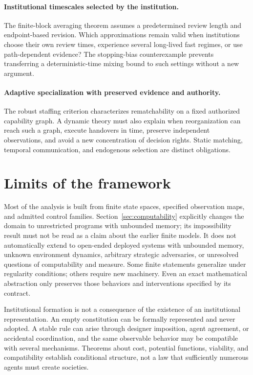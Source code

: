 \documentclass[11pt,letterpaper]{article}
\theoremstyle{plain}
\theoremstyle{definition}
\theoremstyle{remark}
\begin{document}
\paragraph{Institutional timescales selected by the institution.}
The finite-block averaging theorem assumes a predetermined review length and endpoint-based revision. Which approximations remain valid when institutions choose their own review times, experience several long-lived fast regimes, or use path-dependent evidence? The stopping-bias counterexample prevents transferring a deterministic-time mixing bound to such settings without a new argument.

\paragraph{Adaptive specialization with preserved evidence and authority.}
The robust staffing criterion characterizes rematchability on a fixed authorized capability graph. A dynamic theory must also explain when reorganization can reach such a graph, execute handovers in time, preserve independent observations, and avoid a new concentration of decision rights. Static matching, temporal communication, and endogenous selection are distinct obligations.

\section{Limits of the framework}\label{sec:limits}

Most of the analysis is built from finite state spaces, specified observation maps, and admitted control families. Section~\ref{sec:computability} explicitly changes the domain to unrestricted programs with unbounded memory; its impossibility result must not be read as a claim about the earlier finite models. It does not automatically extend to open-ended deployed systems with unbounded memory, unknown environment dynamics, arbitrary strategic adversaries, or unresolved questions of computability and measure. Some finite statements generalize under regularity conditions; others require new machinery. Even an exact mathematical abstraction only preserves those behaviors and interventions specified by its contract.

Institutional formation is not a consequence of the existence of an institutional representation. An empty constitution can be formally represented and never adopted. A stable rule can arise through designer imposition, agent agreement, or accidental coordination, and the same observable behavior may be compatible with several mechanisms. Theorems about cost, potential functions, viability, and compatibility establish conditional structure, not a law that sufficiently numerous agents must create societies.
\end{document}
